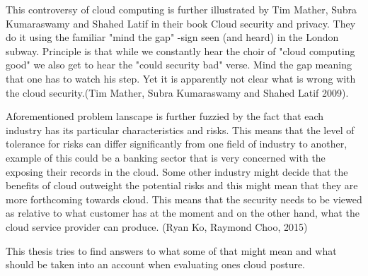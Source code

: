 \documentclass{article}
\begin{document}
This controversy of cloud computing is further illustrated by Tim Mather, Subra Kumaraswamy and Shahed Latif in their book Cloud security and privacy. They do it using the familiar "mind the gap" -sign seen (and heard) in the London subway. Principle is that while we constantly hear the choir of "cloud computing good" we also get to hear the "could security bad" verse. Mind the gap meaning that one has to watch his step. Yet it is apparently not clear what is wrong with the cloud security.(Tim Mather, Subra Kumaraswamy and Shahed Latif 2009).
\par
Aforementioned problem lanscape is further fuzzied by the fact that each industry has its particular characteristics and risks. This means that the level of tolerance for risks can differ significantly from one field of industry to another, example of this could be a banking sector that is very concerned with the exposing their records in the cloud. Some other industry might decide that the benefits of cloud outweight the potential risks and this might mean that they are more forthcoming towards cloud. This means that the security needs to be viewed as relative to what customer has at the moment and on the other hand, what the cloud service provider can produce. (Ryan Ko, Raymond Choo, 2015)
\par
This thesis tries to find answers to what some of that might mean and what should be taken into an account when evaluating ones cloud posture.
\end{document}
